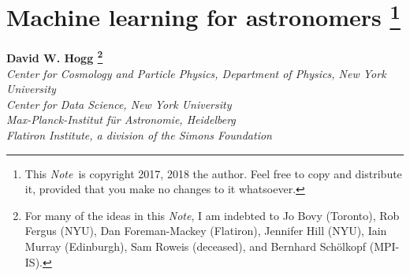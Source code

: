 \documentclass[12pt, letterpaper]{article}
\newcommand{\documentname}{\textsl{Note}}
\begin{document}
\sloppy\sloppypar\raggedbottom\frenchspacing %

\section*{Machine learning for astronomers%
\footnote{This \documentname\ is copyright 2017, 2018 the author. Feel free to copy and
distribute it, provided that you make no changes to it whatsoever.}}

\noindent
\textbf{David W. Hogg%
\footnote{For many of the ideas in this \documentname, I am indebted to
  Jo Bovy (Toronto),
  Rob Fergus (NYU),
  Dan Foreman-Mackey (Flatiron),
  Jennifer Hill (NYU),
  Iain Murray (Edinburgh),
  Sam Roweis (deceased),
  and
  Bernhard Sch\"olkopf (MPI-IS).}}\\
\textsl{\footnotesize
  Center for Cosmology and Particle Physics, Department of Physics, New York University \\
  Center for Data Science, New York University \\
  Max-Planck-Institut f\"ur Astronomie, Heidelberg \\
  Flatiron Institute, a division of the Simons Foundation}
\end{document}
